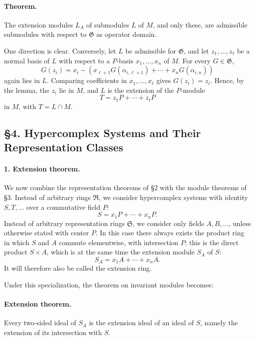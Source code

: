 \documentclass[11pt]{article}
\providecommand{\frR}{\mathfrak R}
\providecommand{\frS}{\mathfrak S}
\providecommand{\frG}{\mathfrak G}
\begin{document}
\paragraph{Theorem.}
The extension modules \(L_A\) of submodules \(L\) of \(M\), and only these, are admissible submodules with respect to \(\frG\) as operator domain.

One direction is clear. Conversely, let \(L\) be admissible for \(\frG\), and let \(z_1,\ldots,z_\ell\) be a normal basis of \(L\) with respect to a \(P\)-basis \(x_1,\ldots,x_n\) of \(M\). For every \(G\in\frG\),
\[
        G(z_i)=x_i-(x_{\ell+1}G(\alpha_{i,\ell+1})+\cdots+x_nG(\alpha_{i,n}))
\]
again lies in \(L\). Comparing coefficients in \(x_1,\ldots,x_\ell\) gives \(G(z_i)=z_i\). Hence, by the lemma, the \(z_i\) lie in \(M\), and \(L\) is the extension of the \(P\)-module
\[
        T=z_1P+\cdots+z_\ell P
\]
in \(M\), with \(T=L\cap M\).

\subsection*{§4. Hypercomplex Systems and Their Representation Classes}

\paragraph{1. Extension theorem.}
We now combine the representation theorems of §2 with the module theorems of §3. Instead of arbitrary rings \(\frR\), we consider hypercomplex systems with identity \(S,T,\ldots\) over a commutative field \(P\):
\[
        S=x_1P+\cdots+x_nP.
\]
Instead of arbitrary representation rings \(\frS\), we consider only fields \(A,B,\ldots\), unless otherwise stated with center \(P\). In this case there always exists the product ring in which \(S\) and \(A\) commute elementwise, with intersection \(P\); this is the direct product \(S\times A\), which is at the same time the extension module \(S_A\) of \(S\):
\[
        S_A=x_1A+\cdots+x_nA.
\]
It will therefore also be called the extension ring.

Under this specialization, the theorem on invariant modules becomes:

\paragraph{Extension theorem.}
Every two-sided ideal of \(S_A\) is the extension ideal of an ideal of \(S\), namely the extension of its intersection with \(S\).
\end{document}
